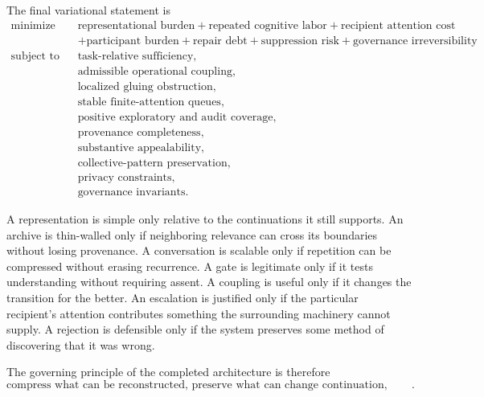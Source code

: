 \documentclass[11pt]{article}
\theoremstyle{definition}
\begin{document}
The final variational statement is
\[
\boxed{
\begin{aligned}
\text{minimize}\quad&
\text{representational burden}
+
\text{repeated cognitive labor}
+
\text{recipient attention cost}
\\
&
+
\text{participant burden}
+
\text{repair debt}
+
\text{suppression risk}
+
\text{governance irreversibility}
\\
\text{subject to}\quad&
\text{task-relative sufficiency},
\\
&
\text{admissible operational coupling},
\\
&
\text{localized gluing obstruction},
\\
&
\text{stable finite-attention queues},
\\
&
\text{positive exploratory and audit coverage},
\\
&
\text{provenance completeness},
\\
&
\text{substantive appealability},
\\
&
\text{collective-pattern preservation},
\\
&
\text{privacy constraints},
\\
&
\text{governance invariants}.
\end{aligned}
}
\]

A representation is simple only relative to the continuations it still supports. An archive is thin-walled only if neighboring relevance can cross its boundaries without losing provenance. A conversation is scalable only if repetition can be compressed without erasing recurrence. A gate is legitimate only if it tests understanding without requiring assent. A coupling is useful only if it changes the transition for the better. An escalation is justified only if the particular recipient's attention contributes something the surrounding machinery cannot supply. A rejection is defensible only if the system preserves some method of discovering that it was wrong.

The governing principle of the completed architecture is therefore
\[
\boxed{
\text{compress what can be reconstructed, preserve what can change continuation, expose what cannot be glued, and audit what finite attention leaves unseen}.
}
\]

\newpage
\end{document}
